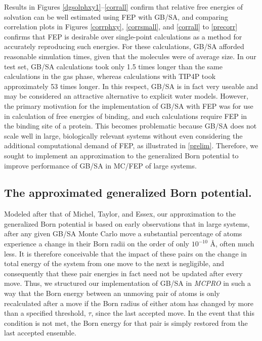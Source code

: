 \documentclass[12pt]{report}
\begin{document}
Results in Figures \ref{dgsolphxy1}--\ref{corrall} confirm that relative free energies of solvation can be well estimated using FEP with GB/SA, and comparing correlation plots in Figures \ref{corrphxy}, \ref{corrsmall}, and \ref{corrall} to \cref{precorr} confirms that FEP is desirable over single-point calculations as a method for accurately reproducing such energies. For these calculations, GB/SA afforded reasonable simulation times, given that the molecules were of average size. In our test set, GB/SA calculations took only 1.5 times longer than the same calculations in the gas phase, whereas calculations with TIP4P took approximately 53 times longer. In this respect, GB/SA is in fact very useable and may be considered an attractive alternative to explicit water models. However, the primary motivation for the implementation of GB/SA with FEP was for use in calculation of free energies of binding, and such calculations require FEP in the binding site of a protein. This becomes problematic because GB/SA does not scale well in large, biologically relevant systems without even considering the additional computational demand of FEP, as illustrated in \cref{prelim}. Therefore, we sought to implement an approximation to the generalized Born potential to improve performance of GB/SA in MC/FEP of large systems.


\subsection{The approximated generalized Born potential.}

Modeled after that of Michel, Taylor, and Essex, \cite{michel4} our approximation to the generalized Born potential is based on early observations that in large systems, after any given GB/SA Monte Carlo move a substantial percentage of atoms experience a change in their Born radii on the order of only $10^{-10}$ \AA, often much less. It is therefore conceivable that the impact of these pairs on the change in total energy of the system from one move to the next is negligible, and consequently that these pair energies in fact need not be updated after every move. Thus, we structured our implementation of GB/SA in \textit{MCPRO} in such a way that the Born energy between an unmoving pair of atoms is only recalculated after a move if the Born radius of either atom has changed by more than a specified threshold, $\tau$, since the last accepted move. In the event that this condition is not met, the Born energy for that pair is simply restored from the last accepted ensemble.
\end{document}
